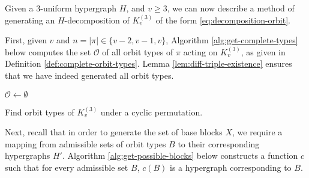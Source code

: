 Given a $3$-uniform hypergraph $H$, and $v \geq 3$, we can now describe a method of generating an $H$-decomposition of $K_{v}^{(3)}$ of the form \eqref{eq:decomposition-orbit}.

First, given $v$ and $n = |\pi| \in \{v-2, v-1, v\}$, Algorithm \ref{alg:get-complete-types} below computes the set $\mathcal{O}$ of all orbit types of $\pi$ acting on $K_{v}^{(3)}$, as given in Definition \ref{def:complete-orbit-types}.
Lemma \ref{lem:diff-triple-existence} ensures that we have indeed generated all orbit types.

\begin{algorithm}

$\mathcal{O} \gets \emptyset$\;




\;

\caption{Find orbit types of $K_v^{(3)}$ under a cyclic permutation.} \label{alg:get-complete-types}
\end{algorithm}

Next, recall that in order to generate the set of base blocks $X$, we require a mapping from admissible sets of orbit types $B$ to their corresponding hypergraphs $H'$.
Algorithm \ref{alg:get-possible-blocks} below constructs a function $c$ such that for every admissible set $B$, $c(B)$ is a hypergraph corresponding to $B$.

